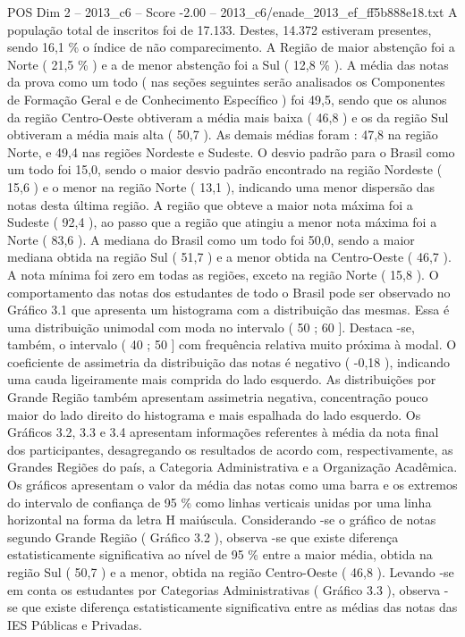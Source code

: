 \begin{textsample}{POS Dim 2 – 2013\_c6 – Score -2.00 – 2013\_c6/enade\_2013\_ef\_ff5b888e18.txt}
A população total de inscritos foi de 17.133.
Destes, 14.372 estiveram presentes, sendo 16,1 \% o índice de não comparecimento.
A Região de maior abstenção foi a Norte ( 21,5 \% ) e a de menor abstenção foi a Sul ( 12,8 \% ).
A média das notas da prova como um todo ( nas seções seguintes serão analisados os Componentes de Formação Geral e de Conhecimento Específico ) foi 49,5, sendo que os alunos da região Centro-Oeste obtiveram a média mais baixa ( 46,8 ) e os da região Sul obtiveram a média mais alta ( 50,7 ).
As demais médias foram : 47,8 na região Norte, e 49,4 nas regiões Nordeste e Sudeste.
O desvio padrão para o Brasil como um todo foi 15,0, sendo o maior desvio padrão encontrado na região Nordeste ( 15,6 ) e o menor na região Norte ( 13,1 ), indicando uma menor dispersão das notas desta última região.
A região que obteve a maior nota máxima foi a Sudeste ( 92,4 ), ao passo que a região que atingiu a menor nota máxima foi a Norte ( 83,6 ).
A mediana do Brasil como um todo foi 50,0, sendo a maior mediana obtida na região Sul ( 51,7 ) e a menor obtida na Centro-Oeste ( 46,7 ).
A nota mínima foi zero em todas as regiões, exceto na região Norte ( 15,8 ).
O comportamento das notas dos estudantes de todo o Brasil pode ser observado no Gráfico 3.1 que apresenta um histograma com a distribuição das mesmas.
Essa é uma distribuição unimodal com moda no intervalo ( 50 ; 60 ].
Destaca -se, também, o intervalo ( 40 ; 50 ] com frequência relativa muito próxima à modal.
O coeficiente de assimetria da distribuição das notas é negativo ( -0,18 ), indicando uma cauda ligeiramente mais comprida do lado esquerdo.
As distribuições por Grande Região também apresentam assimetria negativa, concentração pouco maior do lado direito do histograma e mais espalhada do lado esquerdo.
Os Gráficos 3.2, 3.3 e 3.4 apresentam informações referentes à média da nota final dos participantes, desagregando os resultados de acordo com, respectivamente, as Grandes Regiões do país, a Categoria Administrativa e a Organização Acadêmica.
Os gráficos apresentam o valor da média das notas como uma barra e os extremos do intervalo de confiança de 95 \% como linhas verticais unidas por uma linha horizontal na forma da letra H maiúscula.
Considerando -se o gráfico de notas segundo Grande Região ( Gráfico 3.2 ), observa -se que existe diferença estatisticamente significativa ao nível de 95 \% entre a maior média, obtida na região Sul ( 50,7 ) e a menor, obtida na região Centro-Oeste ( 46,8 ).
Levando -se em conta os estudantes por Categorias Administrativas ( Gráfico 3.3 ), observa -se que existe diferença estatisticamente significativa entre as médias das notas das IES Públicas e Privadas.

\end{textsample}
